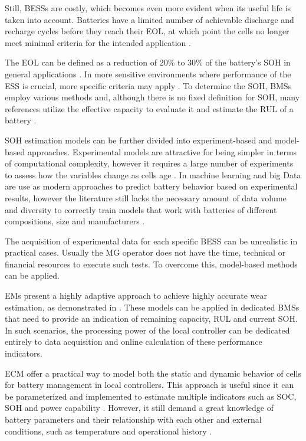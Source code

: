 \documentclass{ieeeaccess}
\begin{document}
    Still, \acp{BESS} are costly, which becomes even more evident when its useful life is taken into account. Batteries have a limited number of achievable discharge and recharge cycles before they reach their \ac{EOL}, at which point the cells no longer meet minimal criteria for the intended application \cite{ZHU2021100537, hart2014modeling}.

    The \ac{EOL} can be defined as a reduction of 20\% to 30\% of the battery's \ac{SOH} in general applications \cite{ECKER2014, NARAYAN2018}. In more sensitive environments where performance of the \ac{ESS} is crucial, more specific criteria may apply \cite{WOOD20115147, JACOB2020101565}. To determine the \ac{SOH}, \acp{BMS} employ various methods and, although there is no fixed definition for \ac{SOH}, many references utilize the effective capacity to evaluate it and estimate the \ac{RUL} of a battery \cite{TIAN2020120813, rezvanizaniani2014review, BIOLOGIC2021, bose2002battery}.

    \ac{SOH} estimation models can be further divided into experiment-based and model-based approaches. Experimental models are attractive for being simpler in terms of computational complexity, however it requires a large number of experiments to assess how the variables change as cells age \cite{XIONG2018264}. In \cite{li2019lithium, kang2014new} machine learning and big Data are use as modern approaches to predict battery behavior based on experimental results, however the literature still lacks the necessary amount of data volume and diversity to correctly train models that work with batteries of different compositions, size and manufacturers \cite{maheshwari2020optimizing}.

    The acquisition of experimental data for each specific \ac{BESS} can be unrealistic in practical cases. Usually the \ac{MG} operator does not have the time, technical or financial resources to execute such tests. To overcome this, model-based methods can be applied.

    \acp{EM} present a highly adaptive approach to achieve highly accurate wear estimation, as demonstrated in \cite{XIONG2018264}. These models can be applied in dedicated \acp{BMS} that need to provide an indication of remaining capacity, \ac{RUL} and current \ac{SOH}. In such scenarios, the processing power of the local controller can be dedicated entirely to data acquisition and online calculation of these performance indicators.

    \ac{ECM} offer a practical way to model both the static and dynamic behavior of cells for battery management in local controllers. This approach is useful since it can be parameterized and implemented to estimate multiple indicators such as \ac{SOC}, \ac{SOH} and power capability \cite{verbrugge2004adaptive, verbrugge2007adaptive}. However, it still demand a great knowledge of battery parameters and their relationship with each other and external conditions, such as temperature and operational history \cite{zhang2018online}.
\end{document}
